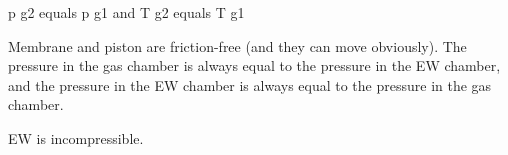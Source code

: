 p g2 equals p g1 and T g2 equals T g1  

Membrane and piston are friction-free (and they can move obviously).  
The pressure in the gas chamber is always equal to the pressure in the EW chamber, and the pressure in the EW chamber is always equal to the pressure in the gas chamber.  

EW is incompressible.